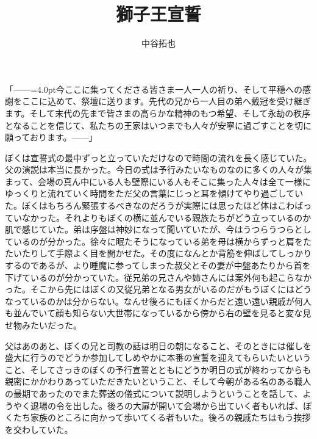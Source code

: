 \documentclass[b5j,twoside,twocolumn]{utarticle}
\title{獅子王宣誓}
\author{中谷拓也}
\date{\vspace{-5mm}}
\makeatletter
\def\yakuchu{%
\@ifnextchar[\@xfootnote %
{\stepcounter{yakuchu}%
\protected@xdef\@thefnmark{\theyakuchu}%
\@footnotemark\@footnotetext}}
\makeatother
\begin{document}
\maketitle

\setlength{\footskip}{-2mm}
\chead[]{}
\rhead[獅子王宣誓]{}
\lfoot[]{\thepage{}}
\cfoot[]{}
\rfoot[\thepage{}]{}

\let\yakuchu=\endnote
\renewcommand{\footnoterule}{\noindent\rule{100mm}{0.3mm}\vskip2mm}
\thispagestyle{fancy}

「\tbaselineshift=2.5pt------\tbaselineshift=4.0pt今ここに集ってくださる皆さま一人一人の祈り、そして平穏への感謝をここに込めて、祭壇に送ります。先代の兄から一人目の弟へ戴冠を受け継ぎます。そして末代の先まで皆さまの高らかな精神のもつ希望、そして永劫の秩序となることを信じて、私たちの王家はいつまでも人々が安寧に過ごすことを切に願っております。\tbaselineshift=2.5pt------\tbaselineshift=4.0pt」


ぼくは宣誓式の最中ずっと立っていただけなので時間の流れを長く感じていた。父の演説は本当に長かった。今日の式は予行みたいなものなのに多くの人々が集まって、会場の真ん中にいる人も壁際にいる人もそこに集った人々は全て一様にゆっくりと流れていく時間をただ父の言葉にじっと耳を傾けてやり過ごしていた。ぼくはもちろん緊張するべきなのだろうが実際には思ったほど体はこわばっていなかった。それよりもぼくの横に並んでいる親族たちがどう立っているのか肌で感じていた。弟は序盤は神妙になって聞いていたが、今はうつらうつらとしているのが分かった。徐々に眠たそうになっている弟を母は横からずっと肩をたたいたりして手際よく目を開かせた。その度になんとか背筋を伸ばしてしっかりするのであるが、より睡魔に参ってしまった叔父とその妻が中盤あたりから首を下げているのが分かっていた。従兄弟の兄さんや姉さんには案外何も起こらなかった。そこから先にはぼくの又従兄弟となる男女がいるのだがもうぼくにはどうなっているのかは分からない。なんせ後ろにもぼくからだと遠い遠い親戚が何人も並んでいて顔も知らない大世帯になっているから傍から右の壁を見ると変な見せ物みたいだった。


父はあのあと、ぼくの兄と司教の話は明日の朝になること、そのときには催しを盛大に行うのでどうか参加してしめやかに本番の宣誓を迎えてもらいたいということ、そしてさっきのぼくの予行宣誓とともにどうか明日の式が終わってからも親密にかかわりあっていただきたいということ、そして今朝がある名のある職人の最期であったのでまた葬送の儀式について説明しようということを話して、ようやく退場の令を出した。後ろの大扉が開いて会場から出ていく者もいれば、ぼくたち家族のところに向かって歩いてくる者もいた。後ろの親戚たちはもう挨拶を交わしていた。
\end{document}
